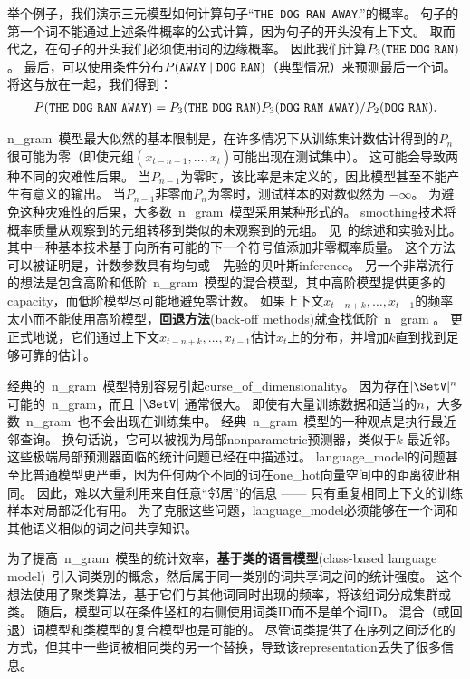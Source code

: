 举个例子，我们演示三元模型如何计算句子``{\tt THE DOG RAN AWAY}.''的概率。
句子的第一个词不能通过上述条件概率的公式计算，因为句子的开头没有上下文。
取而代之，在句子的开头我们必须使用词的边缘概率。
因此我们计算$P_3({\tt THE\ DOG\ RAN})$。
最后，可以使用条件分布$P({\tt AWAY} \mid {\tt DOG\ RAN})$（典型情况）来预测最后一个词。
将这与放在一起，我们得到：
\begin{align}
P({\tt THE\ DOG\ RAN\ AWAY}) = P_3({\tt THE\ DOG\ RAN}) P_3({\tt DOG\ RAN\ AWAY}) / P_2({\tt DOG\ RAN}).
\end{align}

\gls{n_gram}~模型最大似然的基本限制是，在许多情况下从训练集计数估计得到的$P_n$很可能为零（即使元组$(x_{t-n+1},  \dots, x_{t})$可能出现在测试集中）。
这可能会导致两种不同的灾难性后果。
当$P_{n-1}$为零时，该比率是未定义的，因此模型甚至不能产生有意义的输出。
当$P_{n-1}$非零而$P_n$为零时，测试样本的对数似然为 $-\infty$。
为避免这种灾难性的后果，大多数~\gls{n_gram}~模型采用某种形式的。
\gls{smoothing}技术将概率质量从观察到的元组转移到类似的未观察到的元组。
见~\citet{Chen+Goodman99}的综述和实验对比。
其中一种基本技术基于向所有可能的下一个符号值添加非零概率质量。
这个方法可以被证明是，计数参数具有均匀或~~先验的贝叶斯\gls{inference}。
另一个非常流行的想法是包含高阶和低阶~\gls{n_gram}~模型的混合模型，其中高阶模型提供更多的\gls{capacity}，而低阶模型尽可能地避免零计数。
如果上下文$x_{t-n+k}, \ldots, x_{t-1}$的频率太小而不能使用高阶模型，\textbf{回退方法}(back-off methods)就查找低阶~\gls{n_gram} 。
更正式地说，它们通过上下文$x_{t-n+k}, \ldots, x_{t-1}$估计$x_t$上的分布，并增加$k$直到找到足够可靠的估计。


经典的~\gls{n_gram}~模型特别容易引起\gls{curse_of_dimensionality}。
因为存在$|\SetV|^n$可能的~\gls{n_gram}，而且 $|\SetV|$ 通常很大。
即使有大量训练数据和适当的$n$，大多数~\gls{n_gram}~也不会出现在训练集中。
经典~\gls{n_gram}~模型的一种观点是执行最近邻查询。
换句话说，它可以被视为局部\gls{nonparametric}预测器，类似于$k$-最近邻。
这些极端局部预测器面临的统计问题已经在中描述过。
\gls{language_model}的问题甚至比普通模型更严重，因为任何两个不同的词在\gls{one_hot}向量空间中的距离彼此相同。
因此，难以大量利用来自任意``邻居''的信息 —— 只有重复相同上下文的训练样本对局部泛化有用。
为了克服这些问题，\gls{language_model}必须能够在一个词和其他语义相似的词之间共享知识。

为了提高~\gls{n_gram}~模型的统计效率，\textbf{基于类的语言模型}(class-based language model)~\citep{Brown92,Ney+Kneser93,Niesler98}引入词类别的概念，然后属于同一类别的词共享词之间的统计强度。
这个想法使用了聚类算法，基于它们与其他词同时出现的频率，将该组词分成集群或类。
随后，模型可以在条件竖杠的右侧使用词类ID而不是单个词ID。
混合（或回退）词模型和类模型的复合模型也是可能的。
尽管词类提供了在序列之间泛化的方式，但其中一些词被相同类的另一个替换，导致该\gls{representation}丢失了很多信息。

